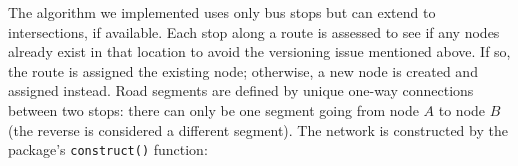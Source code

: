 The algorithm we implemented uses only bus stops but can extend to intersections, if available. Each stop along a route is assessed to see if any nodes already exist in that location to avoid the versioning issue mentioned above. If so, the route is assigned the existing node; otherwise, a new node is created and assigned instead. Road segments are defined by unique one-way connections between two stops: there can only be one segment going from node $A$ to node $B$ (the reverse is considered a different segment). The network is constructed by the  package's \verb+construct()+ function:
\begin{knitrout}\small
{}\color{fgcolor}
\end{knitrout}
